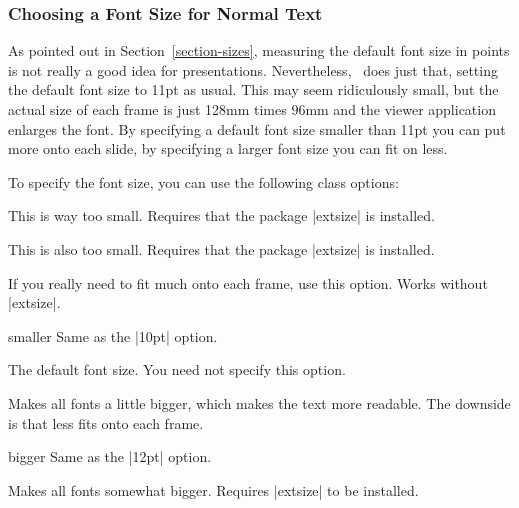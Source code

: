 \subsubsection{Choosing a Font Size for Normal Text}

As pointed out in Section~\ref{section-sizes}, measuring the default
font size in points is not really a good idea for
presentations. Nevertheless, \beamer\ does just that, setting the
default font size to 11pt as usual. This may seem ridiculously small, but 
the actual size of each frame is just 128mm times 96mm and the viewer
application enlarges the font. By specifying a default font size
smaller than 11pt you can put more onto each slide, by specifying a
larger font size you can fit on less.

To specify the font size, you can use the following class options:

\begin{classoption}{8pt}
  This is way too small. Requires that the package |extsize|
  is installed.
\end{classoption}

\begin{classoption}{9pt}
  This is also too small. Requires that the package |extsize|
  is installed.
\end{classoption}

\begin{classoption}{10pt}
  If you really need to fit much onto each frame, use this
  option. Works without |extsize|.
\end{classoption}

\begin{classoption}{smaller}
  Same as the |10pt| option.
\end{classoption}

\begin{classoption}{11pt}
  The default font size. You need not specify this option.
\end{classoption}

\begin{classoption}{12pt}
  Makes all fonts a little bigger, which makes the text more
  readable. The downside is that less fits onto each frame.
\end{classoption}

\begin{classoption}{bigger}
  Same as the |12pt| option.
\end{classoption}

\begin{classoption}{14pt}
  Makes all fonts somewhat bigger. Requires |extsize| to be installed.
\end{classoption}

